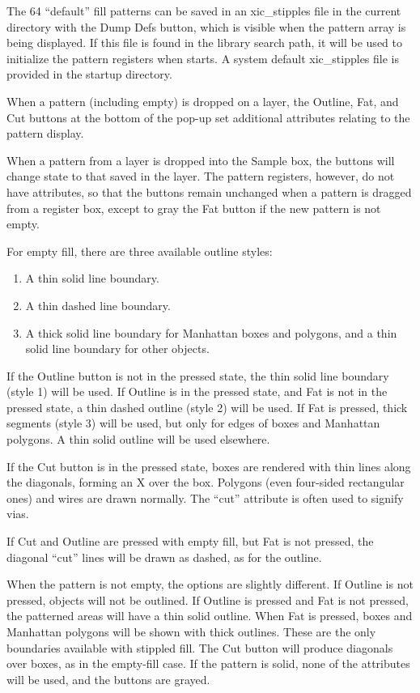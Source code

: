 The 64 ``default'' fill patterns can be saved in an {\vt xic\_stipples}
file in the current directory with the {\cb Dump Defs} button, which
is visible when the pattern array is being displayed.  If this file is
found in the library search path, it will be used to initialize the
pattern registers when {\Xic} starts.  A system default {\vt
xic\_stipples} file is provided in the startup directory.

When a pattern (including empty) is dropped on a layer, the {\cb
Outline}, {\cb Fat}, and {\cb Cut} buttons at the bottom of the pop-up
set additional attributes relating to the pattern display.

When a pattern from a layer is dropped into the {\cb Sample} box, the
buttons will change state to that saved in the layer.  The pattern
registers, however, do not have attributes, so that the buttons remain
unchanged when a pattern is dragged from a register box, except to
gray the {\cb Fat} button if the new pattern is not empty.

For empty fill, there are three available outline styles:
\begin{enumerate}
\item{A thin solid line boundary.}
\item{A thin dashed line boundary.}
\item{A thick solid line boundary for Manhattan boxes and polygons,
and a thin solid line boundary for other objects.}
\end{enumerate}

If the {\cb Outline} button is not in the pressed state, the thin
solid line boundary (style 1) will be used.  If {\cb Outline} is in
the pressed state, and {\cb Fat} is not in the pressed state, a thin
dashed outline (style 2) will be used.  If {\cb Fat} is pressed, thick
segments (style 3) will be used, but only for edges of boxes and
Manhattan polygons.  A thin solid outline will be used elsewhere.

If the {\cb Cut} button is in the pressed state, boxes are rendered
with thin lines along the diagonals, forming an X over the box. 
Polygons (even four-sided rectangular ones) and wires are drawn
normally.  The ``cut'' attribute is often used to signify vias.

If {\cb Cut} and {\cb Outline} are pressed with empty fill, but {\cb
Fat} is not pressed, the diagonal ``cut'' lines will be drawn as
dashed, as for the outline.

When the pattern is not empty, the options are slightly different.  If
{\cb Outline} is not pressed, objects will not be outlined.  If {\cb
Outline} is pressed and {\cb Fat} is not pressed, the patterned areas
will have a thin solid outline.  When {\cb Fat} is pressed, boxes and
Manhattan polygons will be shown with thick outlines.  These are the
only boundaries available with stippled fill.  The {\cb Cut} button
will produce diagonals over boxes, as in the empty-fill case.  If the
pattern is solid, none of the attributes will be used, and the buttons
are grayed.

